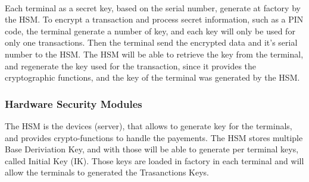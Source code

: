 \documentclass[11pt,a4paper]{article}
\begin{document}
\paragraph{}

Each terminal as a secret key, based on the serial number,
generate at factory by the HSM. To encrypt a transaction and process
secret information, such as a PIN code, the terminal generate a number
of key, and each key will only be used for only one transactions.
Then the terminal send the encrypted data and it's serial number to the HSM.
The HSM will be able to retrieve the key from the terminal, and
regenerate the key used for the transaction, since it provides
the cryptographic functions, and the
key of the terminal was generated by the HSM.


\subsubsection{Hardware Security Modules}


\label{sec:hsm}

The HSM is the devices (server), that allows to generate
key for the terminals, and provides crypto-functions to handle
the payements. The HSM stores multiple Base Deriviation Key, and
with those will be able to generate per terminal keys,
called Initial Key (IK). Those keys are loaded in factory
in each terminal and will allow the terminals to generated
the Trasanctions Keys.





\end{document}
